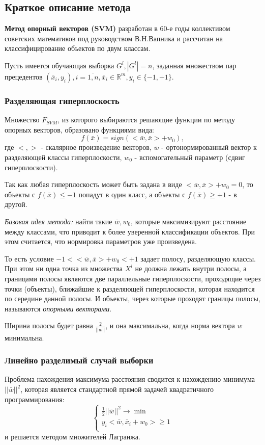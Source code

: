 
\subsection{Краткое описание метода}
\textbf{Метод опорный векторов (SVM)} разработан в 60-е годы коллективом советских математиков под руководством В.Н.Вапника и рассчитан на классифицирование объектов по двум классам.

Пусть имеется обучающая выборка $G^l,|G^l|=n$, заданная множеством пар прецедентов $(\bar{x}_i,y_i),i=\overline{1,n},\bar{x}_i\in\mathbb{R}^m,y_i\in\{-1,+1\}$.

\subsubsection{Разделяющая гиперплоскость}
Множество $F_{SVM}$, из которого выбираются решающие функции по методу опорных векторов, образовано функциями вида:
\begin{equation}
    f(\bar{x})=sign(<\bar{w},\bar{x}>+w_0),
\end{equation}
где $<,>$ - скалярное произведение векторов, $\bar{w}$ - ортонормированный вектор к разделяющей классы гиперплоскости, $w_0$ - вспомогательный параметр (сдвиг гиперплоскости).

Так как любая гиперплоскость может быть задана в виде $<\bar{w},\bar{x}>+w_0=0$, то объекты с $f(\bar{x})\leq-1$ попадут в один класс, а объекты с $f(\bar{x})\geq+1$ - в другой.

\textit{Базовая идея метода:} найти такие $\bar{w},w_0$, которые максимизируют расстояние между классами, что приводит к более уверенной классификации объектов. При этом считается, что нормировка параметров уже произведена.

То есть условие $-1<<\bar{w},\bar{x}>+w_0<+1$ задает полосу, разделяющую классы. При этом ни одна точка из множества $X^l$ не должна лежать внутри полосы, а границами полосы являются две параллельные гиперплоскости, проходящие через точки (объекты), ближайшие к разделяющей гиперплоскости, которая находится по середине данной полосы. И объекты, через которые проходят границы полосы, называются \textit{опорными векторами}.

Ширина полосы будет равна $\frac{2}{||w||}$, и она максимальна, когда норма вектора $w$ минимальна.

\subsubsection{Линейно разделимый случай выборки}
Проблема нахождения максимума расстояния сводится к нахождению минимума $||\bar{w}||^2$, которая является стандартной прямой задачей квадратичного программирования:
\begin{equation}
    \left\{
    \begin{array}{ll}
        \frac{1}{2}||\bar{w}||^2\rightarrow\min\\
        y_i<\bar{w},\bar{x}_i+w_0>\geq1\\
    \end{array}
    \right.
\end{equation}
и решается методом множителей Лагранжа.

